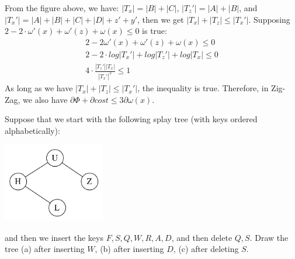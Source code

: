 \documentclass[11pt]{article}
\begin{document}

From the figure above, we have: $|T_x| = |B| + |C|$, $|T_z'| = |A| + |B|$, and $|T_x'| = |A| + |B| + |C| + |D| + z' + y'$, then we get  $|T_x| + |T_z| \leq |T_x'|$.
Supposing $2 - 2\cdot\omega'(x) + \omega'(z) + \omega(x) \leq 0$ is true:
\begin{gather*}
    2 - 2\omega'(x) + \omega'(z) + \omega(x) \leq 0\\
    2 - 2 \cdot log|T_x'| + log|T_z'| + log|T_x| \leq 0 \\
    4 \cdot \frac{|T_z'||T_x|}{|T_x'|^2} \leq 1
\end{gather*}
As long as we have $|T_x| + |T_z| \leq |T_x'|$, the inequality is true.
Therefore, in Zig-Zag, we also have $\partial\Phi + \partial cost \leq 3 \partial\omega(x)$.


\begin{problem}
Suppose that we start with the following splay tree (with keys
ordered alphabetically):
%
\noindent
\begin{center}
\includegraphics[width=1.75in]{hw2_splay_tree.pdf} %
\end{center}
%
and then we insert the keys
$F, S, Q, W, R, A, D$,
and then delete $ Q, S$.
Draw the tree
(a) after inserting $W$, (b) after inserting $D$,
(c) after deleting $S$.
\end{problem}
\end{document}
